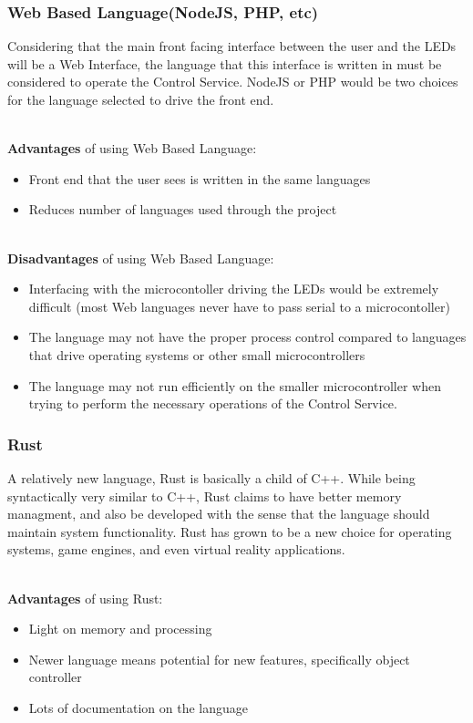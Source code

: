 		\subsubsection{Web Based Language(NodeJS, PHP, etc)}
		Considering that the main front facing interface between the user and the LEDs will be a Web Interface, the language that this interface is written in must be considered to operate
		the Control Service.  NodeJS or PHP would be two choices for the language selected to drive the front end.

		\noindent \\ \textbf{Advantages} of using Web Based Language:
		\begin{itemize}
			\item Front end that the user sees is written in the same languages
			\item Reduces number of languages used through the project
		\end{itemize}

		\noindent \\ \textbf{Disadvantages} of using Web Based Language:
		\begin{itemize}
			\item Interfacing with the microcontoller driving the LEDs would be extremely difficult (most Web languages never have to pass serial to a microcontoller)
			\item The language may not have the proper process control compared to languages that drive operating systems or other small microcontrollers
			\item The language may not run efficiently on the smaller microcontroller when trying to perform the necessary operations of the Control Service.
		\end{itemize}


		\subsubsection{Rust}
		A relatively new language, Rust is basically a child of C++.  While being syntactically very similar to C++, Rust claims to have better memory managment, and also be developed with the
		sense that the language should maintain system functionality.  Rust has grown to be a new choice for operating systems, game engines, and even virtual reality applications. \cite{LANG2}

		\noindent \\ \textbf{Advantages} of using Rust:
		\begin{itemize}
			\item Light on memory and processing
			\item Newer language means potential for new features, specifically object controller
			\item Lots of documentation on the language
		\end{itemize}

